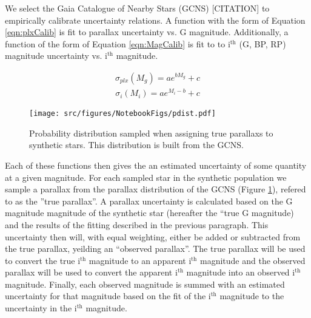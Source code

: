 We select the Gaia Catalogue of Nearby Stars (GCNS) {\color{red}[CITATION]} to
empirically calibrate uncertainty relations. A function with the form of
Equation \ref{eqn:plxCalib} is fit to parallax uncertainty vs. G magnitude.
Additionally, a function of the form of Equation \ref{eqn:MagCalib} is fit to
to i$^{\text{th}}$ (G, BP, RP) magnitude uncertainty vs. i$^{\text{th}}$
magnitude.

\begin{align}\label{eqn:plxCalib}
	\sigma_{plx}(M_{g}) = ae^{bM_{g}}+c
\end{align}
\begin{align}\label{eqn:MagCalib}
	\sigma_{i}(M_{i}) = ae^{M_{i}-b}+c
\end{align}

\begin{figure}
	\centering
	\texttt{[image: src/figures/NotebookFigs/pdist.pdf]}
	\caption{Probability distribution sampled when assigning true parallaxs to
	synthetic stars. This distribution is built from the GCNS.}
	\label{fig:pdist}
\end{figure}

Each of these functions then gives the an estimated uncertainty of some
quantity at a given magnitude. For each sampled star in the synthetic
population we sample a parallax from the parallax distribution of the GCNS
(Figure \ref{fig:pdist}), refered to as the ''true parallax''. A parallax
uncertainty is calculated based on the G magnitude magnitude of the synthetic
star (hereafter the ``true G magnitude) and the results of the fitting
described in the previous paragraph. This uncertainty then will, with equal
weighting, either be added or subtracted from the true parallax, yeilding an
``observed parallax''. The true parallax will be used to convert the true
i$^{\text{th}}$ magnitude to an apparent i$^{\text{th}}$ magnitude and the
observed parallax will be used to convert the apparent i$^{\text{th}}$
magnitude into an observed i$^{\text{th}}$ magnitude. Finally, each observed
magnitude is summed with an estimated uncertainty for that magnitude based on
the fit of the i$^{\text{th}}$ magnitude to the uncertainty in the
i$^{\text{th}}$ magnitude.

